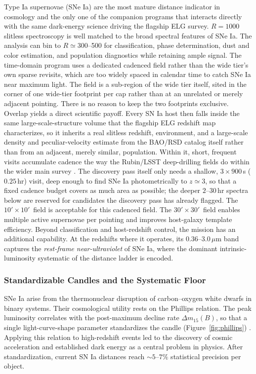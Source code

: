\documentclass[10pt,onecolumn]{article}
\newcommand{\fovsmall}{$10'\!\times10'$}
\newcommand{\fovlarge}{$30'\!\times30'$}
\begin{document}
Type Ia supernovae (SNe Ia) are the most mature distance indicator in cosmology and the only one of the companion programs that interacts directly with the same dark-energy science driving the flagship ELG survey. $R=1000$ slitless spectroscopy is well matched to the broad spectral features of SNe Ia. The analysis can bin to $R\simeq300$--500 for classification, phase determination, dust and color estimation, and population diagnostics while retaining ample signal. The time-domain program uses a dedicated cadenced field rather than the wide tier's own sparse revisits, which are too widely spaced in calendar time to catch SNe Ia near maximum light. The field is a sub-region of the wide tier itself, sited in the corner of one wide-tier footprint per cap rather than at an unrelated or merely adjacent pointing. There is no reason to keep the two footprints exclusive. Overlap yields a direct scientific payoff. Every SN Ia host then falls inside the same large-scale-structure volume that the flagship ELG redshift map characterizes, so it inherits a real slitless redshift, environment, and a large-scale density and peculiar-velocity estimate from the BAO/RSD catalog itself rather than from an adjacent, merely similar, population. Within it, short, frequent visits accumulate cadence the way the Rubin/LSST deep-drilling fields do within the wider main survey \cite{ivezic2019lsst}. The discovery pass itself only needs a shallow, $3\times900$\,s ($0.25$\,hr) visit, deep enough to find SNe Ia photometrically to $z\simeq3$, so that a fixed cadence budget covers as much area as possible; the deeper $2$--$30$\,hr spectra below are reserved for candidates the discovery pass has already flagged. The \fovsmall\ field is acceptable for this cadenced field. The \fovlarge\ field enables multiple active supernovae per pointing and improves host-galaxy template efficiency. Beyond classification and host-redshift control, the mission has an additional capability. At the redshifts where it operates, its $0.36$--$3.0\,\mu$m band captures the \emph{rest-frame near-ultraviolet} of SNe Ia, where the dominant intrinsic-luminosity systematic of the distance ladder is encoded.

\subsubsection{Standardizable Candles and the Systematic Floor}

SNe Ia arise from the thermonuclear disruption of carbon--oxygen white dwarfs in binary systems. Their cosmological utility rests on the Phillips relation. The peak luminosity correlates with the post-maximum decline rate $\Delta m_{15}(B)$, so that a single light-curve-shape parameter standardizes the candle (Figure~\ref{fig:phillips}) \cite{phillips1993}. Applying this relation to high-redshift events led to the discovery of cosmic acceleration \cite{riess1998,perlmutter1999} and established dark energy as a central problem in physics. After standardization, current SN Ia distances reach $\sim5$--$7\%$ statistical precision per object.
\end{document}
